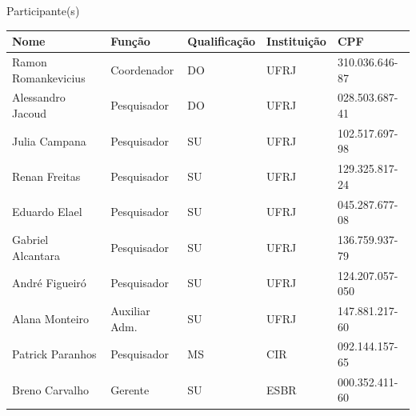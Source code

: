 \begin{center}

  
 \vfill



  {\LARGE Participante(s)}
  \vspace{0.50cm}



  \begin{center}
    \begin{tabular}{| l | l | l | l | l |}
    \hline
   	 Nome 					& Função			 & Qualificação 	& Instituição	 & CPF \\ \hline
   	 Ramon Romankevicius 		& Coordenador 	& DO			 & UFRJ 		& 310.036.646-87\\			\hline
   	Alessandro Jacoud 			& Pesquisador 		& DO 			& UFRJ 	& 028.503.687-41\\ 			\hline
   	Julia Campana 			& Pesquisador		 & SU 			& UFRJ 	& 102.517.697-98\\ 			\hline
   	Renan Freitas 				& Pesquisador 		& SU 			& UFRJ 	& 129.325.817-24\\ 		
   	\hline Eduardo Elael 				& Pesquisador 		& SU 			& UFRJ	 & 045.287.677-08\\ 			\hline
  	Gabriel Alcantara 			& Pesquisador 		& SU 			& UFRJ 	& 136.759.937-79\\ 		
  	\hline André Figueiró 			& Pesquisador 		& SU 			& UFRJ 	& 124.207.057-050\\ 			\hline
   	Alana Monteiro 			 & Auxiliar Adm.	 & SU 			& UFRJ 	& 147.881.217-60\\ 		
   	\hline Patrick  Paranhos 			& Pesquisador 		& MS 			& CIR 	& 092.144.157-65\\ \hline
	Breno Carvalho				 & Gerente 		& SU 			& ESBR 	& 000.352.411-60 \\ 	
\hline

    
    \hline 
    \end{tabular}
\end{center}






\end{center}

\newpage

\hypersetup{pageanchor=true}

